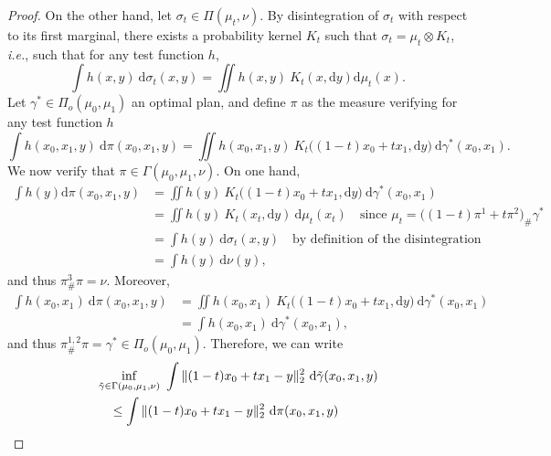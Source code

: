 \documentclass[10pt,a4paper]{amsart}
\begin{document}
\begin{proof}
    On the other hand, let $\sigma_t \in \Pi(\mu_t,\nu)$. By disintegration of $\sigma_t$ with respect to its first marginal, there exists a probability kernel $K_t$ such that $\sigma_t = \mu_t \otimes K_t$, \emph{i.e.}, such that for any test function $h$, 
    \begin{equation}
        \int h(x,y)\ \mathrm{d}\sigma_t(x,y) =  \iint h(x,y)\ K_t(x,\mathrm{d}y)\mathrm{d}\mu_t(x).
    \end{equation}
    Let $\gamma^* \in \Pi_o(\mu_0,\mu_1)$ an optimal plan, and define $\pi$ as the measure verifying for any test function $h$
    \begin{equation}
        \int h(x_0,x_1,y)\ \mathrm{d}\pi(x_0,x_1,y) = \iint h(x_0,x_1,y)\ K_t\big((1-t)x_0+tx_1, \mathrm{d}y\big)\ \mathrm{d}\gamma^*(x_0, x_1).
    \end{equation}
    We now verify that $\pi\in\Gamma(\mu_0,\mu_1,\nu)$. On one hand,
    \begin{equation}
        \begin{aligned}
            \int h(y)\mathrm{d}\pi(x_0,x_1,y) &= \iint h(y)\ K_t\big((1-t)x_0 + tx_1, \mathrm{d}y\big)\ \mathrm{d}\gamma^*(x_0,x_1) \\
            &= \iint h(y)\ K_t(x_t, \mathrm{d}y)\ \mathrm{d}\mu_t(x_t) \quad \text{since $\mu_t = \big((1-t)\pi^1 + t\pi^2\big)_\#\gamma^*$} \\
            &= \int h(y)\ \mathrm{d}\sigma_t(x,y) \quad \text{by definition of the disintegration} \\
            &= \int h(y)\ \mathrm{d}\nu(y),
        \end{aligned}
    \end{equation}
    and thus $\pi^3_\#\pi=\nu$. Moreover,
    \begin{equation}
        \begin{aligned}
            \int h(x_0,x_1)\ \mathrm{d}\pi(x_0,x_1,y) &= \iint h(x_0,x_1)\ K_t\big((1-t)x_0+tx_1, \mathrm{d}y\big)\ \mathrm{d}\gamma^*(x_0,x_1) \\
            &= \int h(x_0,x_1)\ \mathrm{d}\gamma^*(x_0,x_1),
        \end{aligned}
    \end{equation}
    and thus $\pi^{1,2}_\#\pi=\gamma^*\in\Pi_o(\mu_0,\mu_1)$. Therefore, we can write
    \begin{equation}
        \begin{aligned}
            &\inf_{\Tilde{\gamma}\in\Gamma(\mu_0, \mu_1, \nu)}\ \int \|(1-t)x_0 +tx_1 - y\|_2^2\ \mathrm{d}\Tilde{\gamma}(x_0,x_1,y) \\ &\quad \le \int \|(1-t)x_0 + tx_1 - y\|_2^2\ \mathrm{d}\pi(x_0,x_1,y) \\

\end{aligned}
\end{equation}
\end{proof}
\end{document}

